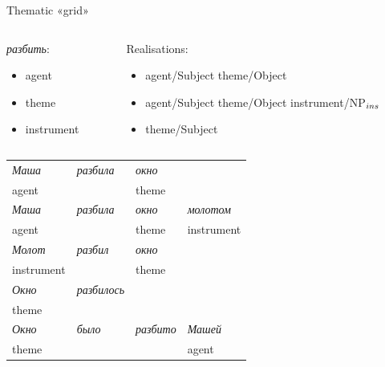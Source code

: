 \documentclass[10pt, compress]{beamer}
\begin{document}
\begin{frame}{Thematic «grid»}
~\\
\begin{columns}
\begin{column}{0.25\textwidth}
\emph{разбить}:
\begin{itemize}
  \item {\sc agent}
  \item {\sc theme}
  \item {\sc instrument}
\end{itemize}
\end{column}
\begin{column}{0.75\textwidth}
Realisations:
\begin{itemize}
\item {\sc agent}/Subject {\sc theme}/Object
\item {\sc agent}/Subject {\sc theme}/Object {\sc instrument}/NP$_{\sc ins}$
\item {\sc theme}/Subject
\end{itemize}
\end{column}
\end{columns}

\begin{center}
\begin{small}
\begin{tabular}{llll}
 \hline
  \emph{Маша}        & \emph{разбила}  & \emph{окно} & \\
  {\sc agent} &          & {\sc theme} & \\
 \hline
  \emph{Маша}  & \emph{разбила}  & \emph{окно}  & \emph{молотом} \\
  {\sc agent} & & {\sc theme} & {\sc instrument} \\
 \hline
  \emph{Молот}  & \emph{разбил}  & \emph{окно}  &  \\
  {\sc instrument} & & {\sc theme} & \\
 \hline
  \emph{Окно}  & \emph{разбилось}  &  &  \\
  {\sc theme } & & &  \\
 \hline
  \emph{Окно}  & \emph{было}  & \emph{разбито}  & \emph{Машей} \\
  {\sc theme } & & & {\sc agent} \\
 \hline
\end{tabular}
\end{small}
\end{center}

\end{frame}
\end{document}

